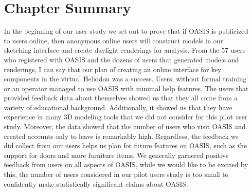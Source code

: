 \section{Chapter Summary}

In the beginning of our user study we set out to prove that if OASIS is publicized to users online, then anonymous online users will construct models in our sketching interface and create daylight renderings for analysis.  From the 57  users who registered with OASIS and the dozens of users that generated models and renderings, I can say that our plan of creating an online interface for key components in the virtual Heliodon was a success.  Users, without formal training or an operator managed to use OASIS with minimal help features.  The users that provided feedback data about themselves showed us that they all come from a variety of educational background.  Additionally, it showed us that they have experience in many 3D modeling tools that we did not consider for this pilot user study.  Moreover, the data showed that the number of users who visit OASIS and created accounts only to leave is remarkably high.  Regardless, the feedback we did collect from our users helps us plan for future features on OASIS, such as the support for doors and more furniture items.  We generally garnered positive feedback from users on all aspects of OASIS, while we would like to be excited by this, the number of users considered in our pilot users study is too small to confidently make statistically significant claims about OASIS. \\ 

























